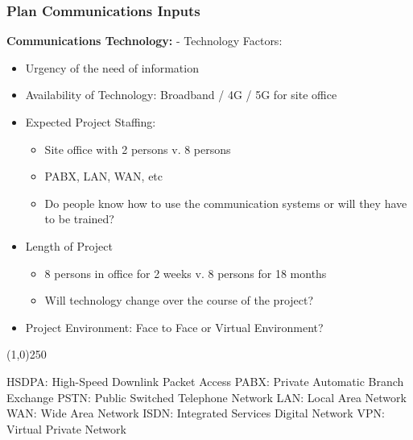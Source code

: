 \begin{frame}
\frametitle{Plan Communications \hfill\hfill Inputs}
\textbf{Communications Technology:} - Technology Factors:\\ 
\begin{itemize}
	\item Urgency of the need of information
	\item Availability of Technology: Broadband / 4G / 5G for site office
	\item Expected Project Staffing: 
		\begin{itemize}
			\item Site office with 2 persons v. 8 persons
		 	\item PABX, LAN, WAN, etc
		 	\item Do people know how to use the communication systems or will they have to be trained?
		\end{itemize}
	\item Length of Project
		\begin{itemize}
			\item 8 persons in office for 2 weeks v. 8 persons for 18 months
			\item Will technology change over the course of the project?
		\end{itemize}
	\item Project Environment: Face to Face or Virtual Environment?
\end{itemize}
\end{frame}\begin{center}\line(1,0){250}\end{center}

HSDPA: High-Speed Downlink Packet Access 
PABX: Private Automatic Branch Exchange
PSTN: Public Switched Telephone Network
LAN: Local Area Network
WAN: Wide Area Network
ISDN: Integrated Services Digital Network
VPN: Virtual Private Network



